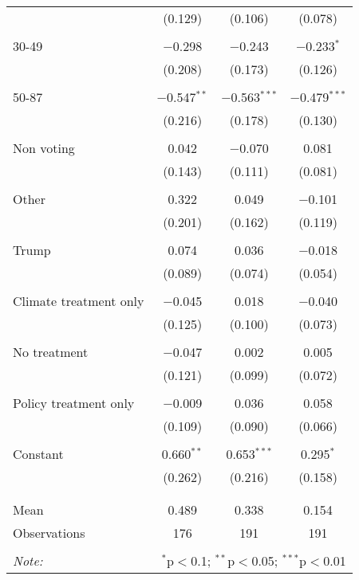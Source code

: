 \begin{tabular}{@{\extracolsep{5pt}}lccc}
  & (0.129) & (0.106) & (0.078) \\ 
  & & & \\ 
 30-49 & $-$0.298 & $-$0.243 & $-$0.233$^{*}$ \\ 
  & (0.208) & (0.173) & (0.126) \\ 
  & & & \\ 
 50-87 & $-$0.547$^{**}$ & $-$0.563$^{***}$ & $-$0.479$^{***}$ \\ 
  & (0.216) & (0.178) & (0.130) \\ 
  & & & \\ 
 Non voting & 0.042 & $-$0.070 & 0.081 \\ 
  & (0.143) & (0.111) & (0.081) \\ 
  & & & \\ 
 Other & 0.322 & 0.049 & $-$0.101 \\ 
  & (0.201) & (0.162) & (0.119) \\ 
  & & & \\ 
 Trump & 0.074 & 0.036 & $-$0.018 \\ 
  & (0.089) & (0.074) & (0.054) \\ 
  & & & \\ 
 Climate treatment only & $-$0.045 & 0.018 & $-$0.040 \\ 
  & (0.125) & (0.100) & (0.073) \\ 
  & & & \\ 
 No treatment & $-$0.047 & 0.002 & 0.005 \\ 
  & (0.121) & (0.099) & (0.072) \\ 
  & & & \\ 
 Policy treatment only & $-$0.009 & 0.036 & 0.058 \\ 
  & (0.109) & (0.090) & (0.066) \\ 
  & & & \\ 
 Constant & 0.660$^{**}$ & 0.653$^{***}$ & 0.295$^{*}$ \\ 
  & (0.262) & (0.216) & (0.158) \\ 
  & & & \\ 
\hline \\[-1.8ex] 
Mean & 0.489 & 0.338 & 0.154 \\ 
Observations & 176 & 191 & 191 \\ 
\hline 
\hline \\[-1.8ex] 
\textit{Note:}  & \multicolumn{3}{r}{$^{*}$p$<$0.1; $^{**}$p$<$0.05; $^{***}$p$<$0.01} \\ 
\end{tabular} 
